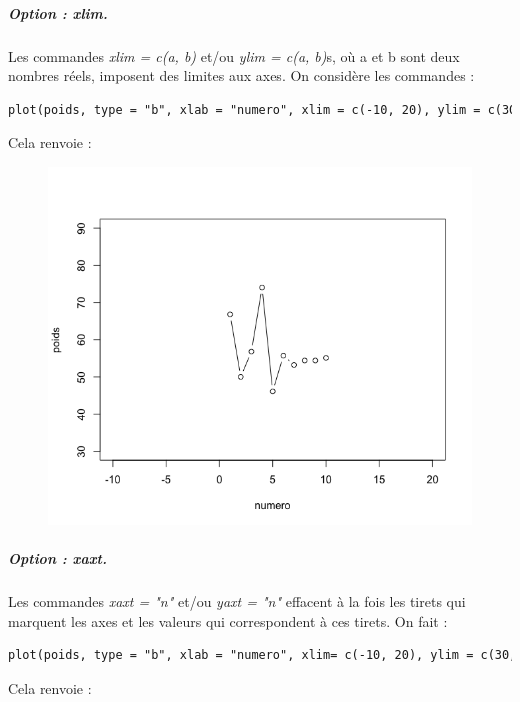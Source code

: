 \subparagraph{Option : xlim.} 
Les commandes \textit{xlim = c(a, b)} et/ou \textit{ylim = c(a, b)}s, où a et b sont deux nombres réels, imposent des limites aux axes.\newline
On considère les commandes :
\begin{lstlisting}[language=html]
plot(poids, type = "b", xlab = "numero", xlim = c(-10, 20), ylim = c(30,90))
\end{lstlisting}
Cela renvoie :
\begin{figure}[H]\begin{center}\includegraphics[scale=0.4]{ilu/gra15.png}\end{center}\end{figure}
\subparagraph{Option : xaxt.} 
Les commandes \textit{xaxt = "n"} et/ou \textit{yaxt = "n"} effacent à la fois les tirets qui marquent les axes et les valeurs qui correspondent à ces tirets.\newline
On fait :
\begin{lstlisting}[language=html]
plot(poids, type = "b", xlab = "numero", xlim= c(-10, 20), ylim = c(30, 90), xaxt="n",yaxt="n")
\end{lstlisting}
Cela renvoie :
